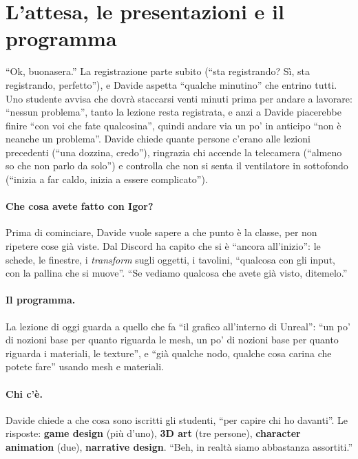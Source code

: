 \section{L'attesa, le presentazioni e il programma}
\label{ue3:sec:attesa}

``Ok, buonasera.'' La registrazione parte subito (``sta registrando? Sì, sta
registrando, perfetto''), e Davide aspetta ``qualche minutino'' che entrino tutti. Uno
studente avvisa che dovrà staccarsi venti minuti prima per andare a lavorare: ``nessun
problema'', tanto la lezione resta registrata, e anzi a Davide piacerebbe finire ``con
voi che fate qualcosina'', quindi andare via un po' in anticipo ``non è neanche un
problema''. Davide chiede quante persone c'erano alle lezioni precedenti (``una dozzina,
credo''), ringrazia chi accende la telecamera (``almeno so che non parlo da solo'') e
controlla che non si senta il ventilatore in sottofondo (``inizia a far caldo, inizia a
essere complicato'').

\paragraph{Che cosa avete fatto con Igor?} Prima di cominciare, Davide vuole sapere a
che punto è la classe, per non ripetere cose già viste. Dal Discord ha capito che si è
``ancora all'inizio'': le schede, le finestre, i \emph{transform} sugli oggetti, i
tavolini, ``qualcosa con gli input, con la pallina che si muove''. ``Se vediamo
qualcosa che avete già visto, ditemelo.''

\paragraph{Il programma.} La lezione di oggi guarda a quello che fa ``il grafico
all'interno di Unreal'': ``un po' di nozioni base per quanto riguarda le mesh, un po' di
nozioni base per quanto riguarda i materiali, le texture'', e ``già qualche nodo,
qualche cosa carina che potete fare'' usando mesh e materiali.

\paragraph{Chi c'è.} Davide chiede a che cosa sono iscritti gli studenti, ``per capire
chi ho davanti''. Le risposte: \textbf{game design} (più d'uno), \textbf{3D art}
(tre persone), \textbf{character animation} (due), \textbf{narrative design}. ``Beh, in
realtà siamo abbastanza assortiti.''

